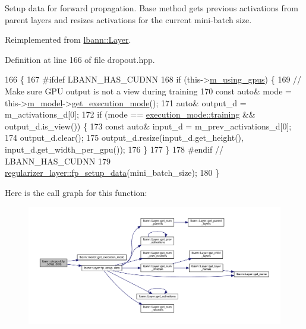Setup data for forward propagation. Base method gets previous activations from parent layers and resizes activations for the current mini-\/batch size. 

Reimplemented from \hyperlink{classlbann_1_1Layer_af311d901a5f71e4c749454647e9fd9c7}{lbann\+::\+Layer}.



Definition at line 166 of file dropout.\+hpp.


\begin{DoxyCode}
166                                                    \{
167 \textcolor{preprocessor}{  #ifdef LBANN\_HAS\_CUDNN}
168     \textcolor{keywordflow}{if} (this->\hyperlink{classlbann_1_1Layer_af7881cb5eff5207c15fa835d65462e8f}{m\_using\_gpus}) \{
169       \textcolor{comment}{// Make sure GPU output is not a view during training}
170       \textcolor{keyword}{const} \textcolor{keyword}{auto}& mode = this->\hyperlink{classlbann_1_1Layer_a3d9315e99574166f2f33e37b572021d2}{m\_model}->\hyperlink{classlbann_1_1model_addb40597cf29aa6d31b6a7d09ef48608}{get\_execution\_mode}();
171       \textcolor{keyword}{auto}& output\_d = m\_activations\_d[0];
172       \textcolor{keywordflow}{if} (mode == \hyperlink{base_8hpp_a2781a159088df64ed7d47cc91c4dc0a8ac185ddac8b5a8f5aa23c5b80bc12d214}{execution\_mode::training} && output\_d.is\_view()) \{
173         \textcolor{keyword}{const} \textcolor{keyword}{auto}& input\_d = m\_prev\_activations\_d[0];
174         output\_d.clear();
175         output\_d.resize(input\_d.get\_height(), input\_d.get\_width\_per\_gpu());
176       \}
177     \}
178 \textcolor{preprocessor}{  #endif // LBANN\_HAS\_CUDNN}
179     \hyperlink{classlbann_1_1Layer_af311d901a5f71e4c749454647e9fd9c7}{regularizer\_layer::fp\_setup\_data}(mini\_batch\_size);
180   \}
\end{DoxyCode}
Here is the call graph for this function\+:\nopagebreak
\begin{figure}[H]
\begin{center}
\leavevmode
\includegraphics[width=350pt]{classlbann_1_1dropout_a478368964f515f5456324b6504a5358f_cgraph}
\end{center}
\end{figure}
\mbox{\label{classlbann_1_1dropout_aefeb16614f9bf4b9e643e1d5b48ec62d}} 
